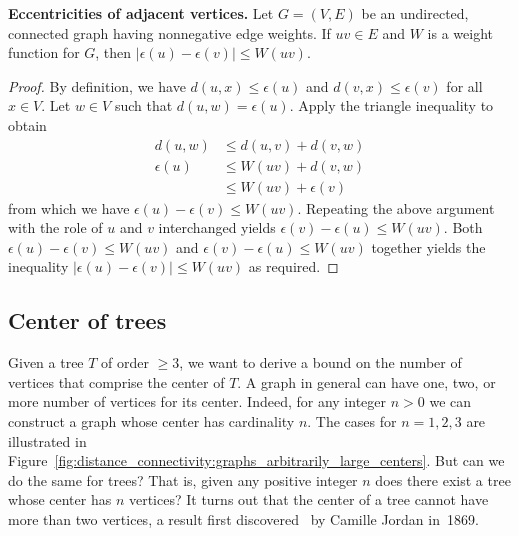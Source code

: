 \begin{theorem}
\textbf{Eccentricities of adjacent vertices.}
Let $G = (V,E)$ be an undirected, connected graph having nonnegative
edge weights. If $uv \in E$ and $W$ is a weight function for $G$, then
$|\epsilon(u) - \epsilon(v)| \leq W(uv)$.
\end{theorem}

\begin{proof}
By definition, we have $d(u,x) \leq \epsilon(u)$ and
$d(v,x) \leq \epsilon(v)$ for all $x \in V$. Let $w \in V$ such that
$d(u,w) = \epsilon(u)$. Apply the triangle inequality to obtain
\begin{align*}
d(u,w) &\leq d(u,v) + d(v,w) \\
\epsilon(u) &\leq W(uv) + d(v,w) \\
            &\leq W(uv) + \epsilon(v)
\end{align*}
from which we have $\epsilon(u) - \epsilon(v) \leq W(uv)$. Repeating
the above argument with the role of $u$ and $v$ interchanged yields
$\epsilon(v) - \epsilon(u) \leq W(uv)$. Both
$\epsilon(u) - \epsilon(v) \leq W(uv)$ and
$\epsilon(v) - \epsilon(u) \leq W(uv)$ together yields the inequality
$|\epsilon(u) - \epsilon(v)| \leq W(uv)$ as required.
\end{proof}



\subsection{Center of trees}

Given a tree $T$ of order $\geq 3$, we want to derive a bound on the
number of vertices that comprise the center of $T$. A graph in general
can have one, two, or more number of vertices for its center. Indeed,
for any integer $n > 0$ we can construct a graph whose center has
cardinality $n$. The cases for $n = 1, 2, 3$ are illustrated in
Figure~\ref{fig:distance_connectivity:graphs_arbitrarily_large_centers}. But
can we do the same for trees? That is, given any positive integer $n$
does there exist a tree whose center has $n$ vertices? It turns out
that the center of a tree cannot have more than two vertices, a result
first discovered~\cite{Jordan1869} by Camille
Jordan in~1869.

